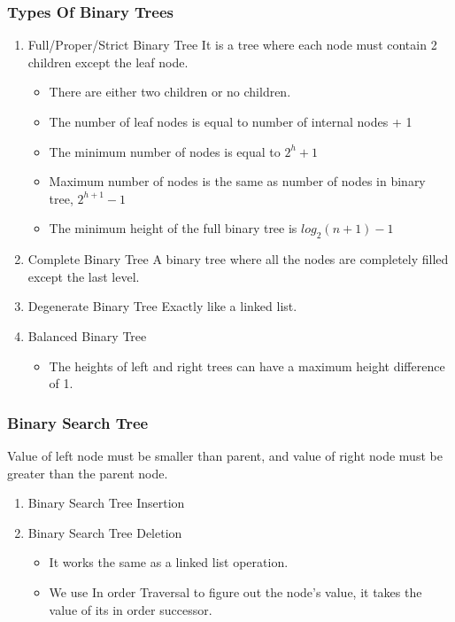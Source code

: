 \documentclass[11pt]{article}
\begin{document}
\subsubsection{Types Of Binary Trees}
\label{sec:org555bfbf}
\begin{enumerate}
\item Full/Proper/Strict Binary Tree
\label{sec:orge9322ec}
It is a tree where each node must contain 2 children except the leaf node.

\begin{itemize}
\item There are either two children or no children.
\item The number of leaf nodes is equal to number of internal nodes + 1
\item The minimum number of nodes is equal to \(2^h + 1\)
\item Maximum number of nodes is the same as number of nodes in binary tree, \(2^{h+1} - 1\)
\item The minimum height of the full binary tree is \(log_2(n+1) - 1\)
\end{itemize}
\item Complete Binary Tree
\label{sec:org25ac63d}
A binary tree where all the nodes are completely filled except the last level.
\item Degenerate Binary Tree
\label{sec:org3a20b33}
Exactly like a linked list.
\item Balanced Binary Tree
\label{sec:orgcd9ff50}
\begin{itemize}
\item The heights of left and right trees can have a maximum height difference of 1.
\end{itemize}
\end{enumerate}
\subsubsection{Binary Search Tree}
\label{sec:org4083163}
Value of left node must be smaller than parent, and value of right node must be greater than the parent node.
\begin{enumerate}
\item Binary Search Tree Insertion
\label{sec:orge2ff0b4}
\item Binary Search Tree Deletion
\label{sec:orge709d6d}
\begin{itemize}
\item It works the same as a linked list operation.
\item We use In order Traversal to figure out the node's value, it takes the value of its in order successor.
\end{itemize}
\end{enumerate}
\end{document}
